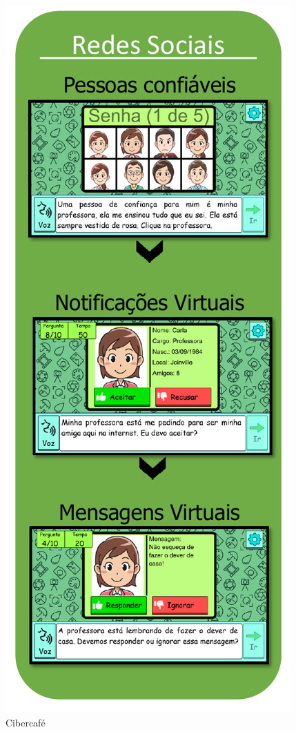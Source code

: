 \begin{figure}%
  \vspace{-20pt}
  \caption{\label{fig:Cibercafe}Cibercafé}
  \includegraphics[width=\linewidth]{./Visuais/Cibercafe2.pdf}
  \vspace{-1.0cm}
\end{figure}

